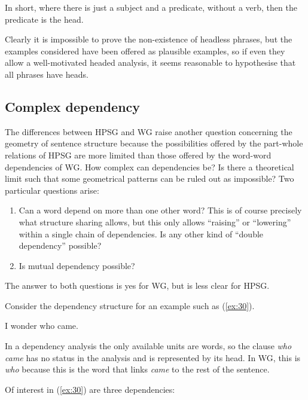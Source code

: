 \documentclass[output=paper]{langscibook}
\begin{document}
In short, where there is just a subject and a predicate, without a verb, then the predicate is the head.

Clearly it is impossible to prove the non-existence of headless phrases, but the examples considered have been offered as plausible examples, so if even they allow a well-motivated headed analysis, it seems reasonable to hypothesise that all phrases have heads.


\subsection{Complex dependency}
\label{sec:5.2}

The differences between HPSG and WG raise another question concerning the geometry of sentence structure because the possibilities offered by the part-whole relations of HPSG are more limited than those offered by the word-word dependencies of WG. How complex can dependencies be? Is there a theoretical limit such that some geometrical patterns can be ruled out as impossible? Two particular questions arise:

\begin{enumerate}
	\item \label{it:4} Can a word depend on more than one other word? This is of course precisely what structure sharing allows, but this only allows ``raising'' or ``lowering'' within a single chain of dependencies. Is any other kind of ``double dependency'' possible?
	
	\item \label{it:5} Is mutual dependency possible?
\end{enumerate}

The answer to both questions is yes for WG, but is less clear for HPSG.

Consider the dependency structure for an example such as (\ref{ex:30}).

\begin{exe}
	\ex \label{ex:30} I wonder who came.
\end{exe}
	
In a dependency analysis the only available units are words, so the clause \emph{who came} has no status in the analysis and is represented by its head. In WG, this is \emph{who} because this is the word that links \emph{came} to the rest of the sentence.

Of interest in (\ref{ex:30}) are three dependencies:
\end{document}
